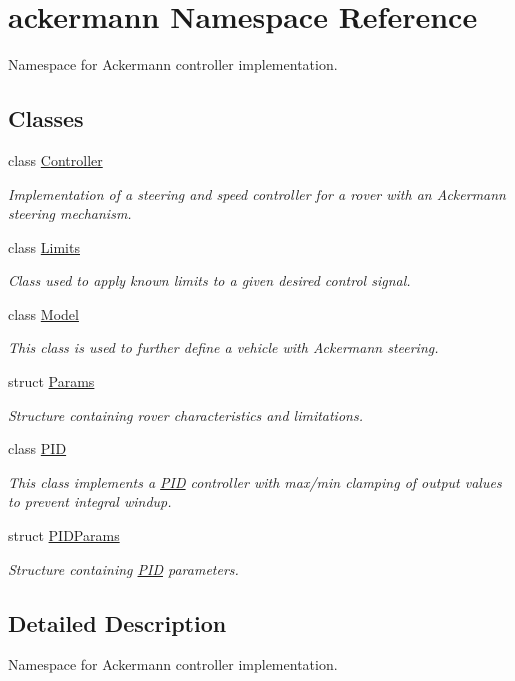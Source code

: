 \hypertarget{namespaceackermann}{}\section{ackermann Namespace Reference}
\label{namespaceackermann}


Namespace for Ackermann controller implementation.  


\subsection*{Classes}
\begin{DoxyCompactItemize}
\item 
class \hyperlink{classackermann_1_1_controller}{Controller}
\begin{DoxyCompactList}\small\item\em Implementation of a steering and speed controller for a rover with an Ackermann steering mechanism. \end{DoxyCompactList}\item 
class \hyperlink{classackermann_1_1_limits}{Limits}
\begin{DoxyCompactList}\small\item\em Class used to apply known limits to a given desired control signal. \end{DoxyCompactList}\item 
class \hyperlink{classackermann_1_1_model}{Model}
\begin{DoxyCompactList}\small\item\em This class is used to further define a vehicle with Ackermann steering. \end{DoxyCompactList}\item 
struct \hyperlink{structackermann_1_1_params}{Params}
\begin{DoxyCompactList}\small\item\em Structure containing rover characteristics and limitations. \end{DoxyCompactList}\item 
class \hyperlink{classackermann_1_1_p_i_d}{P\+ID}
\begin{DoxyCompactList}\small\item\em This class implements a \hyperlink{classackermann_1_1_p_i_d}{P\+ID} controller with max/min clamping of output values to prevent integral windup. \end{DoxyCompactList}\item 
struct \hyperlink{structackermann_1_1_p_i_d_params}{P\+I\+D\+Params}
\begin{DoxyCompactList}\small\item\em Structure containing \hyperlink{classackermann_1_1_p_i_d}{P\+ID} parameters. \end{DoxyCompactList}\end{DoxyCompactItemize}


\subsection{Detailed Description}
Namespace for Ackermann controller implementation. 